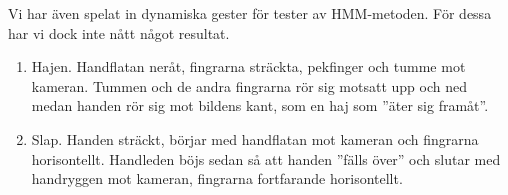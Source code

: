 \documentclass[../rapport_MVEX01-11-05]{subfiles}
\begin{document}
Vi har även spelat in dynamiska gester för tester av HMM-metoden. För
dessa har vi dock inte nått något resultat.
\begin{enumerate}
\item Hajen. Handflatan neråt, fingrarna sträckta, pekfinger och tumme
  mot kameran. Tummen och de andra fingrarna rör sig motsatt upp och
  ned medan handen rör sig mot bildens kant, som en haj som ''äter sig
  framåt''.
\item Slap. Handen sträckt, börjar med handflatan mot kameran och
  fingrarna horisontellt. Handleden böjs sedan så att handen ''fälls
  över'' och slutar med handryggen mot kameran, fingrarna fortfarande
  horisontellt. 
\end{enumerate}
\end{document}
